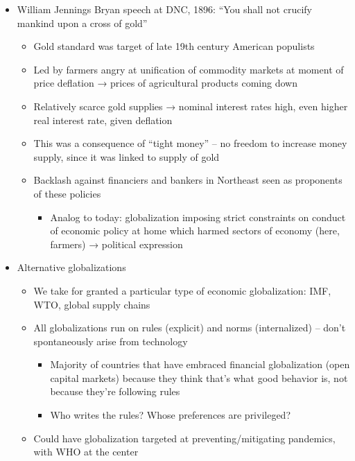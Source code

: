 \begin{itemize}
\tightlist
\item
  William Jennings Bryan speech at DNC, 1896: ``You shall not crucify
  mankind upon a cross of gold''

  \begin{itemize}
  \tightlist
  \item
    Gold standard was target of late 19th century American populists
  \item
    Led by farmers angry at unification of commodity markets at moment
    of price deflation → prices of agricultural products coming down
  \item
    Relatively scarce gold supplies → nominal interest rates high, even
    higher real interest rate, given deflation
  \item
    This was a consequence of ``tight money'' -- no freedom to increase
    money supply, since it was linked to supply of gold
  \item
    Backlash against financiers and bankers in Northeast seen as
    proponents of these policies

    \begin{itemize}
    \tightlist
    \item
      Analog to today: globalization imposing strict constraints on
      conduct of economic policy at home which harmed sectors of economy
      (here, farmers) → political expression
    \end{itemize}
  \end{itemize}
\item
  Alternative globalizations

  \begin{itemize}
  \tightlist
  \item
    We take for granted a particular type of economic globalization:
    IMF, WTO, global supply chains
  \item
    All globalizations run on rules (explicit) and norms (internalized)
    -- don't spontaneously arise from technology

    \begin{itemize}
    \tightlist
    \item
      Majority of countries that have embraced financial globalization
      (open capital markets) because they think that's what good
      behavior is, not because they're following rules
    \item
      Who writes the rules? Whose preferences are privileged?
    \end{itemize}
  \item
    Could have globalization targeted at preventing/mitigating
    pandemics, with WHO at the center


\end{itemize}
\end{itemize}
